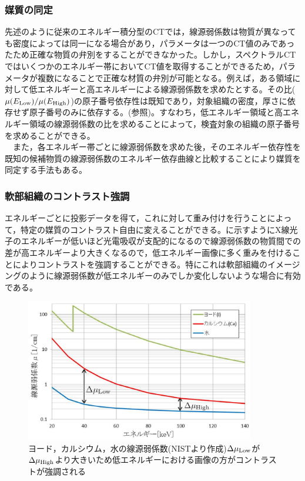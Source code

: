 \subsubsection*{媒質の同定}
先述のように従来のエネルギー積分型のCTでは，線源弱係数は物質が異なっても密度によっては同一になる場合があり，パラメータは一つのCT値のみであったため正確な物質の弁別をすることができなかった。しかし，スペクトラルCTではいくつかのエネルギー帯においてCT値を取得することができるため，パラメータが複数になることで正確な材質の弁別が可能となる。例えば，ある領域に対して低エネルギーと高エネルギーによる線源弱係数を求めたとする。その比($\mu(E_{\rm Low})/\mu(E_{\rm High})$)の原子番号依存性は既知であり，対象組織の密度，厚さに依存せず原子番号のみに依存する。(参照)。すなわち，低エネルギー領域と高エネルギー領域の線源弱係数の比を求めることによって，検査対象の組織の原子番号を求めることができる\cite{material_id}。\\
\ \ また，各エネルギー帯ごとに線源弱係数を求めた後，そのエネルギー依存性を既知の候補物質の線源弱係数のエネルギー依存曲線と比較することにより媒質を同定する手法もある\cite{ogawa_id}。



\subsubsection*{軟部組織のコントラスト強調}
エネルギーごとに投影データを得て，これに対して重み付けを行うことによって，特定の媒質のコントラスト自由に変えることができる。に示すようにX線光子のエネルギーが低いほど光電吸収が支配的になるので線源弱係数の物質間での差が高エネルギーより大きくなるので，低エネルギー画像に多く重みを付けることによりコントラストを強調することができる。特にこれは軟部組織のイメージングのように線源弱係数が低エネルギーのみでしか変化しないような場合に有効である\cite{kowase}\cite{ogawa_kaisetu}。

\begin{figure}[H]
 \begin{center}
 \includegraphics[width=10cm]{image/other/material_atten.eps}
 \end{center}
  \vspace{-0.7cm}
 \caption{ヨード，カルシウム，水の線源弱係数(NISTより作成)\newline $\Delta\mu_{\rm Low}$が$\Delta\mu_{\rm High}$より大きいため低エネルギーにおける画像の方がコントラストが強調される}
 \label{fig:material_atten}
\end{figure}


